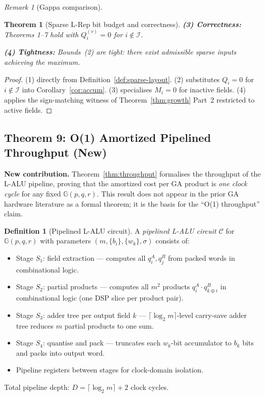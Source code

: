 \documentclass[11pt,a4paper]{article}
\theoremstyle{definition}
\newtheorem{definition}{Definition}[section]
\theoremstyle{plain}
\newtheorem{theorem}{Theorem}[section]
\theoremstyle{remark}
\newtheorem{remark}{Remark}[section]
\newcommand{\GA}{\mathbb{G}}
\newcommand{\ceil}[1]{\lceil #1 \rceil}
\begin{document}
\begin{remark}[Gappa comparison]
\begin{theorem}[Sparse L-Rep bit budget and correctness]
\textbf{(3) Correctness:} Theorems 1--7 hold with $Q_i^{(v)}=0$ for $i\notin\mathcal{I}$.

\textbf{(4) Tightness:} Bounds~(2) are tight: there exist admissible sparse inputs achieving the maximum.
\end{theorem}

\begin{proof}
(1) directly from Definition~\ref{def:sparse-layout}.
(2) substitutes $Q_i=0$ for $i\notin\mathcal{I}$ into Corollary~\ref{cor:accum}.
(3) specialises $M_i=0$ for inactive fields.
(4) applies the sign-matching witness of Theorem~\ref{thm:growth} Part~2 restricted to active fields.
\end{proof}

\subsection{Theorem 9: O(1) Amortized Pipelined Throughput (New)}
\label{sec:throughput}

\begin{newresult}
\textbf{New contribution.} Theorem~\ref{thm:throughput} formalises the
throughput of the L-ALU pipeline, proving that the amortized cost per
GA product is \emph{one clock cycle} for any fixed $\GA(p,q,r)$.
This result does not appear in the prior GA hardware literature as a
formal theorem; it is the basis for the ``O(1) throughput'' claim.
\end{newresult}

\begin{definition}[Pipelined L-ALU circuit]
A \emph{pipelined L-ALU circuit} $\mathcal{C}$ for $\GA(p,q,r)$
with parameters $(m, \{b_i\}, \{w_k\}, \sigma)$ consists of:
\begin{itemize}
  \item Stage $S_1$: field extraction --- computes all $q_i^A, q_j^B$
        from packed words in combinational logic.
  \item Stage $S_2$: partial products --- computes all $m^2$ products
        $q_i^A\cdot q_{k\oplus i}^B$ in combinational logic (one
        DSP slice per product pair).
  \item Stage $S_3$: adder tree per output field $k$ --- $\ceil{\log_2 m}$-level
        carry-save adder tree reduces $m$ partial products to one sum.
  \item Stage $S_4$: quantise and pack --- truncates each $w_k$-bit
        accumulator to $b_k$ bits and packs into output word.
  \item Pipeline registers between stages for clock-domain isolation.
\end{itemize}
Total pipeline depth: $D = \ceil{\log_2 m} + 2$ clock cycles.
\end{definition}


\end{remark}
\end{document}
